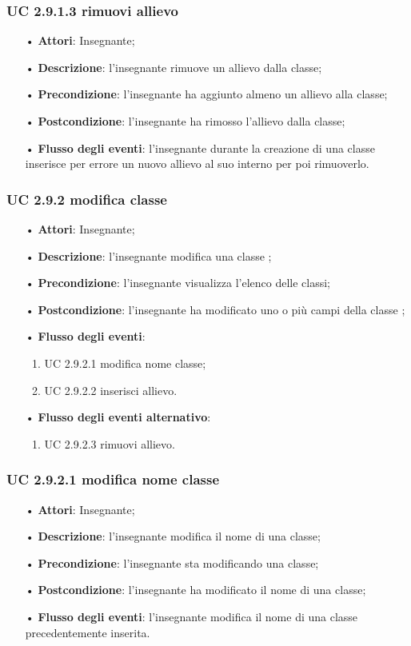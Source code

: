 \subsubsection{UC 2.9.1.3 rimuovi allievo}
\begin{itemize}
	\item[•] \textbf{Attori}: Insegnante;
	\item[•] \textbf{Descrizione}: l'insegnante rimuove un allievo dalla classe;
	\item[•] \textbf{Precondizione}: l'insegnante ha aggiunto almeno un allievo alla classe;
	\item[•] \textbf{Postcondizione}: l'insegnante ha rimosso l'allievo dalla classe;
	\item[•] \textbf{Flusso degli eventi}: l'insegnante durante la creazione di una classe inserisce per errore un nuovo allievo al suo interno per poi rimuoverlo.
\end{itemize}


\subsubsection{UC 2.9.2 modifica classe}
\begin{itemize}
	\item[•] \textbf{Attori}: Insegnante;
	\item[•] \textbf{Descrizione}: l'insegnante modifica una classe ;
	\item[•] \textbf{Precondizione}: l'insegnante visualizza l'elenco delle classi;
	\item[•] \textbf{Postcondizione}: l'insegnante ha modificato uno o più campi della classe ;
	\item[•] \textbf{Flusso degli eventi}:
	\begin{enumerate}
		\item UC 2.9.2.1 modifica nome classe;
		\item UC 2.9.2.2 inserisci allievo.
	\end{enumerate}
	\item[•] \textbf{Flusso degli eventi alternativo}:
	\begin{enumerate}
		\item UC 2.9.2.3 rimuovi allievo.
	\end{enumerate}
\end{itemize}

\subsubsection{UC 2.9.2.1 modifica nome classe}
\begin{itemize}
	\item[•] \textbf{Attori}: Insegnante;
	\item[•] \textbf{Descrizione}: l'insegnante modifica il nome di una classe;
	\item[•] \textbf{Precondizione}: l'insegnante sta modificando una classe;
	\item[•] \textbf{Postcondizione}: l'insegnante ha modificato il nome di una classe;
	\item[•] \textbf{Flusso degli eventi}: l'insegnante modifica il nome di una classe precedentemente inserita.
\end{itemize}

